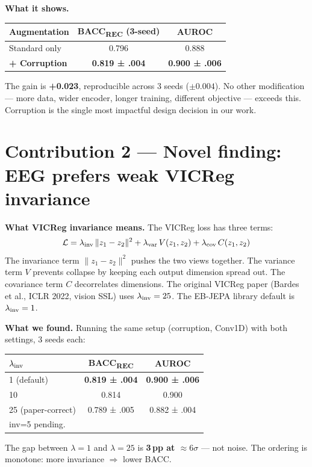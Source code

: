 \documentclass[11pt,a4paper]{article}
\begin{document}
\textbf{What it shows.}
\begin{center}
\begin{tabular}{lcc}
\toprule
Augmentation & BACC\textsubscript{REC} (3-seed) & AUROC \\
\midrule
Standard only & 0.796 & 0.888 \\
\textbf{+ Corruption} & \textbf{0.819 ± .004} & \textbf{0.900 ± .006} \\
\bottomrule
\end{tabular}
\end{center}
The gain is \textbf{+0.023}, reproducible across 3 seeds ($\pm0.004$).
No other modification — more data, wider encoder, longer training, different
objective — exceeds this.  Corruption is the single most impactful design
decision in our work.

\bigskip

\section{Contribution 2 — Novel finding: EEG prefers weak VICReg invariance}

\textbf{What VICReg invariance means.}
The VICReg loss has three terms:
\[
\mathcal{L} = \lambda_{\rm inv}\,\|z_1 - z_2\|^2
            + \lambda_{\rm var}\,V(z_1, z_2)
            + \lambda_{\rm cov}\,C(z_1, z_2)
\]
The invariance term $\|z_1 - z_2\|^2$ pushes the two views together.
The variance term $V$ prevents collapse by keeping each output dimension
spread out.  The covariance term $C$ decorrelates dimensions.
The original VICReg paper (Bardes et al., ICLR 2022, vision SSL)
uses $\lambda_{\rm inv} = 25$.  The EB-JEPA library default is
$\lambda_{\rm inv} = 1$.

\textbf{What we found.}
Running the same setup (corruption, Conv1D) with both settings, 3 seeds each:
\begin{center}
\begin{tabular}{lcc}
\toprule
$\lambda_{\rm inv}$ & BACC\textsubscript{REC} & AUROC \\
\midrule
1 (default) & \textbf{0.819 ± .004} & \textbf{0.900 ± .006} \\
10 & 0.814 & 0.900 \\
25 (paper-correct) & 0.789 ± .005 & 0.882 ± .004 \\
\bottomrule
\multicolumn{3}{l}{\footnotesize inv=5 pending.}
\end{tabular}
\end{center}
The gap between $\lambda{=}1$ and $\lambda{=}25$ is \textbf{3\,pp at ${\approx}6\sigma$} —
not noise.  The ordering is monotone: more invariance $\Rightarrow$ lower BACC.
\end{document}

